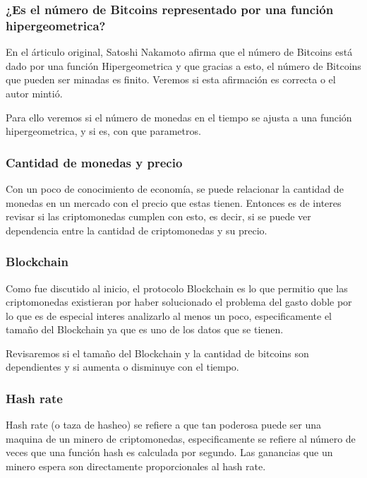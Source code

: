 \documentclass[12pt,letterpaper]{article}
\begin{document}
    \subsubsection*{¿Es el número de Bitcoins representado por una función hipergeometrica?}

    En el árticulo original, Satoshi Nakamoto afirma que el número de Bitcoins está dado por una función Hipergeometrica y que gracias a esto, el número de Bitcoins que pueden ser minadas es finito.
    Veremos si esta afirmación es correcta o el autor mintió.

    Para ello veremos si el número de monedas en el tiempo se ajusta a una función hipergeometrica, y si es, con que parametros.



    \subsubsection*{Cantidad de monedas y precio}

    Con un poco de conocimiento de economía, se puede relacionar la cantidad de monedas en un mercado con el precio que estas tienen. Entonces es de interes revisar si las criptomonedas cumplen con esto, es decir, si se puede ver dependencia entre la cantidad de criptomonedas y su precio.

    \subsubsection*{Blockchain}

    Como fue discutido al inicio, el protocolo Blockchain es lo que permitio que las criptomonedas existieran por haber solucionado el problema del gasto doble por lo que es de especial interes analizarlo al menos un poco, especificamente el tamaño del Blockchain ya que es uno de los datos que se tienen.

    Revisaremos si el tamaño del Blockchain y la cantidad de bitcoins son dependientes y si aumenta o disminuye con el tiempo.

    \subsubsection*{Hash rate}

    Hash rate (o taza de hasheo) se refiere a que tan poderosa puede ser una maquina de un minero de criptomonedas, especificamente se refiere al número de veces que una función hash es calculada por segundo. Las ganancias que un minero espera son directamente proporcionales al hash rate.
\end{document}
